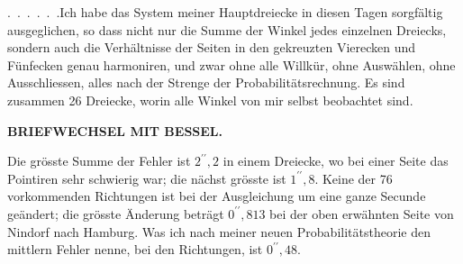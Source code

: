\par\noindent\hspace*{\parindent}.\ .\ .\ .\ .\ .\quad Ich habe das System meiner Hauptdreiecke in diesen Tagen sorgfältig ausgeglichen, so dass nicht nur die Summe der Winkel jedes einzelnen Dreiecks, sondern auch die Verhältnisse der Seiten in den gekreuzten Vierecken und Fünfecken genau harmoniren, und zwar ohne alle Willkür, ohne Auswählen, ohne Ausschliessen, alles nach der Strenge der Probabilitätsrechnung.
Es sind zusammen 26 Dreiecke, worin alle Winkel von mir selbst beobachtet sind.
\par\clearpage
{}\hfill{\small\textbf{BRIEFWECHSEL MIT BESSEL.}}\par\medskip
\noindent Die grösste Summe der Fehler ist \(2^{\prime\prime}{,}2\) in einem Dreiecke, wo bei einer Seite das Pointiren sehr schwierig war; die nächst grösste ist \(1^{\prime\prime}{,}8\).
Keine der 76 vorkommenden Richtungen ist bei der Ausgleichung um eine ganze Secunde geändert; die grösste Änderung beträgt \(0^{\prime\prime}{,}813\) bei der oben erwähnten Seite von Nindorf nach Hamburg.
Was ich nach meiner neuen Probabilitätstheorie den mittlern Fehler nenne, bei den Richtungen, ist \(0^{\prime\prime}{,}48\).
\par\endgroup

